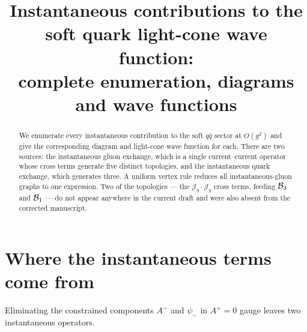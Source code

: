 \documentclass[11pt]{article}
\title{\bf Instantaneous contributions to the soft quark light-cone wave function:\\
complete enumeration, diagrams and wave functions}
\date{}\author{}
\newcommand{\Jc}{\mathcal{J}}
\begin{document}
\maketitle
\vspace{-1.2cm}

\begin{abstract}\noindent
We enumerate every instantaneous contribution to the soft $q\bar q$ sector at $O(g^{2})$ and give
the corresponding diagram and light-cone wave function for each. There are two sources: the
instantaneous gluon exchange, which is a single current--current operator whose cross terms
generate five distinct topologies, and the instantaneous quark exchange, which generates three.
A uniform vertex rule reduces all instantaneous-gluon graphs to one expression. Two of the
topologies --- the $\Jc_{q}\!\cdot\!\Jc_{g}$ cross terms, feeding $\mathcal{B}_{3}$ and $\mathcal{B}_{1}$ --- do not
appear anywhere in the current draft and were also absent from the corrected manuscript.
\end{abstract}

\section{Where the instantaneous terms come from}

Eliminating the constrained components $A^{-}$ and $\psi_{-}$ in $A^{+}=0$ gauge leaves two
instantaneous operators.
\end{document}
